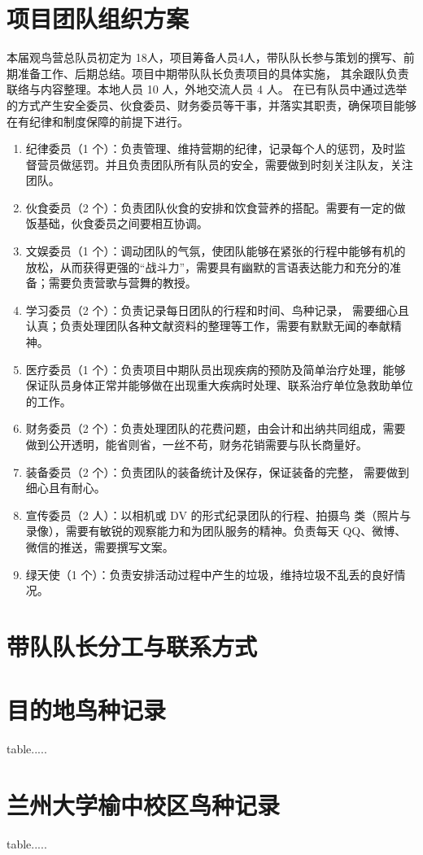 \documentclass[UTF8,a4paper，12pt]{ctexart}
\begin{document}
\section*{项目团队组织方案}
本届观鸟营总队员初定为 18人，项目筹备人员4人，带队队长参与策划的撰写、前期准备工作、后期总结。项目中期带队队长负责项目的具体实施， 其余跟队负责联络与内容整理。本地人员 10 人，外地交流人员 4 人。
在已有队员中通过选举的方式产生安全委员、伙食委员、财务委员等干事，并落实其职责，确保项目能够在有纪律和制度保障的前提下进行。
\begin{enumerate}[itemindent=1em]
\item 纪律委员（1 个）：负责管理、维持营期的纪律，记录每个人的惩罚，及时监督营员做惩罚。并且负责团队所有队员的安全，需要做到时刻关注队友，关注团队。
\item 伙食委员（2 个）：负责团队伙食的安排和饮食营养的搭配。需要有一定的做饭基础，伙食委员之间要相互协调。
\item 文娱委员（1 个）：调动团队的气氛，使团队能够在紧张的行程中能够有机的放松，从而获得更强的“战斗力”，需要具有幽默的言语表达能力和充分的准备；需要负责营歌与营舞的教授。
\item 学习委员（2 个）：负责记录每日团队的行程和时间、鸟种记录， 需要细心且认真；负责处理团队各种文献资料的整理等工作，需要有默默无闻的奉献精神。
\item 医疗委员（1 个）：负责项目中期队员出现疾病的预防及简单治疗处理，能够保证队员身体正常并能够做在出现重大疾病时处理、联系治疗单位急救助单位的工作。
\item 财务委员（2  个）：负责处理团队的花费问题，由会计和出纳共同组成，需要做到公开透明，能省则省，一丝不苟，财务花销需要与队长商量好。
\item 装备委员（2 个）：负责团队的装备统计及保存，保证装备的完整， 需要做到细心且有耐心。
\item 宣传委员（2 人）：以相机或 DV 的形式纪录团队的行程、拍摄鸟 类（照片与录像），需要有敏锐的观察能力和为团队服务的精神。负责每天 QQ、微博、微信的推送，需要撰写文案。
\item 绿天使（1 个）：负责安排活动过程中产生的垃圾，维持垃圾不乱丢的良好情况。
\end{enumerate}
\section*{带队队长分工与联系方式}
\section*{目的地鸟种记录}
table.....
\section*{兰州大学榆中校区鸟种记录}
table.....
\end{document}
